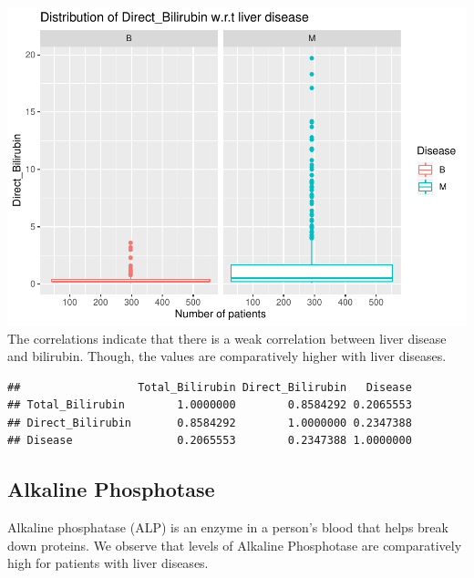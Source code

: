 \documentclass[]{article}
\newenvironment{Shaded}{\begin{snugshade}}{\end{snugshade}}
\newcommand{\DataTypeTok}[1]{\textcolor[rgb]{0.13,0.29,0.53}{#1}}
\newcommand{\DecValTok}[1]{\textcolor[rgb]{0.00,0.00,0.81}{#1}}
\newcommand{\KeywordTok}[1]{\textcolor[rgb]{0.13,0.29,0.53}{\textbf{#1}}}
\newcommand{\NormalTok}[1]{#1}
\newcommand{\OperatorTok}[1]{\textcolor[rgb]{0.81,0.36,0.00}{\textbf{#1}}}
\newcommand{\StringTok}[1]{\textcolor[rgb]{0.31,0.60,0.02}{#1}}
\begin{document}
\includegraphics{LiverDisease_files/figure-latex/unnamed-chunk-10-1.pdf}
The correlations indicate that there is a weak correlation between liver
disease and bilirubin. Though, the values are comparatively higher with
liver diseases.

\begin{Shaded}
\end{Shaded}

\begin{verbatim}
##                  Total_Bilirubin Direct_Bilirubin   Disease
## Total_Bilirubin        1.0000000        0.8584292 0.2065553
## Direct_Bilirubin       0.8584292        1.0000000 0.2347388
## Disease                0.2065553        0.2347388 1.0000000
\end{verbatim}

\subsection{Alkaline Phosphotase}

Alkaline phosphatase (ALP) is an enzyme in a person's blood that helps
break down proteins. We observe that levels of Alkaline Phosphotase are
comparatively high for patients with liver diseases.
\end{document}
